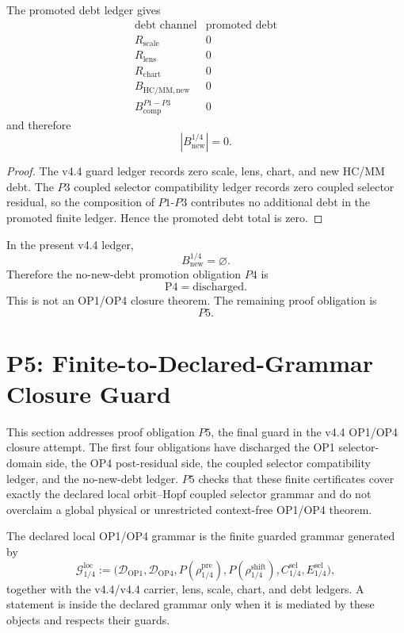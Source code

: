 \begin{proposition}
The promoted debt ledger gives
\[
\begin{array}{c|r}
\text{debt channel} & \text{promoted debt}\\
\hline
R_{\mathrm{scale}} & 0\\
R_{\mathrm{lens}} & 0\\
R_{\mathrm{chart}} & 0\\
B_{\mathrm{HC/MM,new}} & 0\\
B_{\mathrm{comp}}^{P1-P3} & 0
\end{array}
\]
and therefore
\[
    |B_{\mathrm{new}}^{1/4}|=0.
\]
\end{proposition}

\begin{proof}
The v4.4 guard ledger records zero scale, lens, chart, and new HC/MM debt.  The
\(P3\) coupled selector compatibility ledger records zero coupled selector
residual, so the composition of \(P1\)-\(P3\) contributes no additional debt in
the promoted finite ledger.  Hence the promoted debt total is zero.
\end{proof}

\begin{theorem}[P4 discharge]
In the present v4.4 ledger,
\[
    B_{\mathrm{new}}^{1/4}=\varnothing.
\]
Therefore the no-new-debt promotion obligation \(P4\) is
\[
    \mathrm{P4}=\mathrm{discharged}.
\]
This is not an OP1/OP4 closure theorem.  The remaining proof obligation is
\[
    P5.
\]
\end{theorem}



\section{P5: Finite-to-Declared-Grammar Closure Guard}
\label{sec:v45-p5-finite-to-declared-grammar-closure-guard}

This section addresses proof obligation \(P5\), the final guard in the v4.4
OP1/OP4 closure attempt.  The first four obligations have discharged the OP1
selector-domain side, the OP4 post-residual side, the coupled selector
compatibility ledger, and the no-new-debt ledger.  \(P5\) checks that these
finite certificates cover exactly the declared local orbit--Hopf coupled
selector grammar and do not overclaim a global physical or unrestricted
context-free OP1/OP4 theorem.

\begin{definition}
The declared local OP1/OP4 grammar is the finite guarded grammar generated by
\[
    \mathcal G_{1/4}^{\mathrm{loc}}
    :=
    \bigl(
    \mathcal D_{\mathrm{OP1}},
    \mathcal D_{\mathrm{OP4}},
    P(\rho_{1/4}^{\mathrm{pre}}),
    P(\rho_{1/4}^{\mathrm{shift}}),
    C_{1/4}^{\mathrm{sel}},
    E_{1/4}^{\mathrm{sel}}
    \bigr),
\]
together with the v4.4/v4.4 carrier, lens, scale, chart, and debt ledgers.
A statement is inside the declared grammar only when it is mediated by these
objects and respects their guards.
\end{definition}

